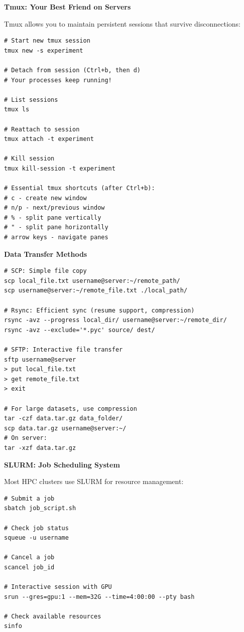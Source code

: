 \documentclass[11pt,a4paper]{article}
\begin{document}
\textbf{Tmux: Your Best Friend on Servers}

Tmux allows you to maintain persistent sessions that survive disconnections:

\begin{lstlisting}[style=bashstyle]
# Start new tmux session
tmux new -s experiment

# Detach from session (Ctrl+b, then d)
# Your processes keep running!

# List sessions
tmux ls

# Reattach to session
tmux attach -t experiment

# Kill session
tmux kill-session -t experiment

# Essential tmux shortcuts (after Ctrl+b):
# c - create new window
# n/p - next/previous window
# % - split pane vertically
# " - split pane horizontally
# arrow keys - navigate panes
\end{lstlisting}

\textbf{Data Transfer Methods}

\begin{tcolorbox}[colback=yellow!5,colframe=orange!60,title={Transferring Files to/from Servers}]
\begin{lstlisting}[style=bashstyle]
# SCP: Simple file copy
scp local_file.txt username@server:~/remote_path/
scp username@server:~/remote_file.txt ./local_path/

# Rsync: Efficient sync (resume support, compression)
rsync -avz --progress local_dir/ username@server:~/remote_dir/
rsync -avz --exclude='*.pyc' source/ dest/

# SFTP: Interactive file transfer
sftp username@server
> put local_file.txt
> get remote_file.txt
> exit

# For large datasets, use compression
tar -czf data.tar.gz data_folder/
scp data.tar.gz username@server:~/
# On server:
tar -xzf data.tar.gz
\end{lstlisting}
\end{tcolorbox}

\textbf{SLURM: Job Scheduling System}

Most HPC clusters use SLURM for resource management:

\begin{lstlisting}[style=bashstyle]
# Submit a job
sbatch job_script.sh

# Check job status
squeue -u username

# Cancel a job
scancel job_id

# Interactive session with GPU
srun --gres=gpu:1 --mem=32G --time=4:00:00 --pty bash

# Check available resources
sinfo
\end{lstlisting}
\end{document}
